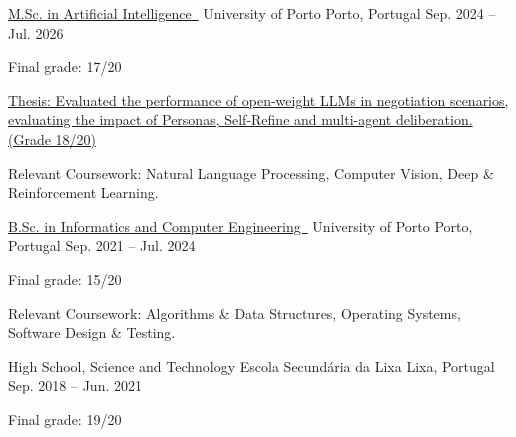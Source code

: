 
\begin{cventries}
  \cventry
    {\href{https://sigarra.up.pt/feup/pt/cur_geral.cur_planos_estudos_view?pv_plano_id=40865\&pv_ano_lectivo=2024\&pv_tipo_cur_sigla=M\&pv_origem=CUR}{M.Sc. in Artificial Intelligence~\faExternalLink}}
    {University of Porto}
    {Porto, Portugal}
    {Sep. 2024 -- Jul. 2026}
    {
      \begin{cvitems}
        \item {Final grade: 17/20}
        \item {\href{https://www.adrianomachado.pt/work/llm-negotiation}{Thesis: Evaluated the performance of open-weight LLMs in negotiation scenarios, evaluating the impact of Personas, Self-Refine and multi-agent deliberation. (Grade 18/20)}}
        \item {Relevant Coursework: Natural Language Processing, Computer Vision, Deep \& Reinforcement Learning.}
      \end{cvitems}
    }
  \cventry
    {\href{https://sigarra.up.pt/feup/pt/cur_geral.cur_planos_estudos_view?pv_plano_id=31224\&pv_ano_lectivo=2023\&pv_tipo_cur_sigla=\&pv_origem=CUR}{B.Sc. in Informatics and Computer Engineering~\faExternalLink}}
    {University of Porto}
    {Porto, Portugal}
    {Sep. 2021 -- Jul. 2024}
    {
      \begin{cvitems}
        \item {Final grade: 15/20}
        \item {Relevant Coursework: Algorithms \& Data Structures, Operating Systems, Software Design \& Testing.}
      \end{cvitems}
    }
    
  \cventry
    {High School, Science and Technology}
    {Escola Secundária da Lixa}
    {Lixa, Portugal}
    {Sep. 2018 -- Jun. 2021}
    {
      \begin{cvitems}
        \item {Final grade: 19/20}
      \end{cvitems}
    }
\end{cventries}